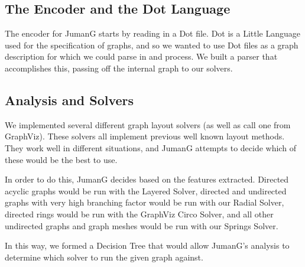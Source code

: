 \documentclass{article}
\begin{document}
\subsection{The Encoder and the Dot Language}
The encoder for JumanG starts by reading in a Dot file. 
Dot is a Little Language used for the specification of graphs, and so we wanted to use Dot files as a graph description for which we could parse in and process.
We built a parser that accomplishes this, passing off the internal graph to our solvers.


\subsection{Analysis and Solvers}
We implemented several different graph layout solvers (as well as call one from GraphViz). These solvers all implement previous well known layout methods. They work well in different situations, and JumanG attempts to decide which of these would be the best to use.

In order to do this, JumanG decides based on the features extracted. Directed acyclic graphs would be run with the Layered Solver, directed and undirected graphs with very high branching factor would be run with our Radial Solver, directed rings would be run with the GraphViz Circo Solver, and all other undirected graphs and graph meshes would be run with our Springs Solver. 

In this way, we formed a Decision Tree that would allow JumanG's analysis to determine which solver to run the given graph against.
\end{document}
